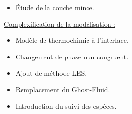 \documentclass{beamer}
\begin{document}
\begin{frame}
\begin{multicols}{2}
\begin{itemize}
        
        \item Étude de la couche mince.
        \end{itemize}
		
\end{multicols}

\center\color{cea_rouge}\underline{Complexification de la modélisation :} \color{cea_texte}
\begin{multicols}{2}
        \begin{itemize}
        
        
        \item Modèle de thermochimie à l'interface.
        \item Changement de phase non congruent.
        \end{itemize}
        
\columnbreak
			
		
        \begin{itemize}
        
        \item Ajout de méthode LES.
        \item Remplacement du Ghost-Fluid.
        \item Introduction du suivi des espèces.
        \end{itemize}
		
\end{multicols}



\end{frame}





        	
        	  	
        	
\end{document}
